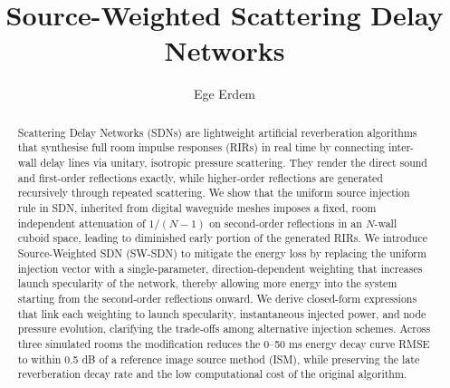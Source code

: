 \documentclass[journal]{IEEEtran}
\begin{document}
\title{Source-Weighted Scattering Delay Networks}
\author{Ege Erdem}

\maketitle
\begin{abstract}
Scattering Delay Networks (SDNs) are lightweight artificial reverberation algorithms that synthesise full room impulse responses (RIRs) in real time by connecting inter-wall delay lines via unitary, isotropic pressure scattering. They render the direct sound and first-order reflections exactly, while higher-order reflections are generated recursively through repeated scattering. We show that the uniform source injection rule in SDN, inherited from digital waveguide meshes imposes a fixed, room independent attenuation of $1/(N-1)$ on second-order reflections in an $N$-wall cuboid space, leading to diminished early portion of the generated RIRs. We introduce Source-Weighted SDN (SW-SDN) to mitigate the energy loss by replacing the uniform injection vector with a single-parameter, direction-dependent weighting that increases launch specularity of the network, thereby allowing more energy into the system starting from the second-order reflections onward. We derive closed-form expressions that link each weighting to launch specularity, instantaneous injected power, and node pressure evolution, clarifying the trade-offs among alternative injection schemes. Across three simulated rooms the modification reduces the 0–50 ms energy decay curve RMSE to within 0.5 dB of a reference image source method (ISM), while preserving the late reverberation decay rate and the low computational cost of the original algorithm.


\end{abstract}
\end{document}
